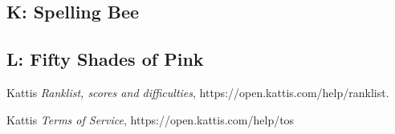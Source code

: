\documentclass{article}
\begin{document}


\subsection{K: Spelling Bee}



\subsection{L: Fifty Shades of Pink}










\newpage

\begin{thebibliography}{1}
Kattis \emph{Ranklist, scores and difficulties}, https://open.kattis.com/help/ranklist.

Kattis \emph{Terms of Service}, https://open.kattis.com/help/tos

\end{thebibliography}
\end{document}
